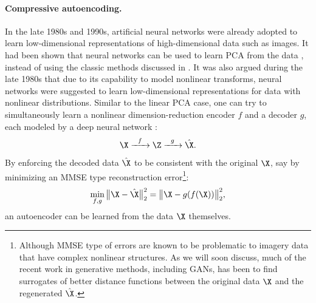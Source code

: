 \documentclass[../../book-main.tex]{subfiles}
\begin{document}
\paragraph{Compressive autoencoding.}
In the late 1980s and 1990s, artificial neural networks were already adopted to learn low-dimensional representations of high-dimensional data such as images. It had been shown that neural networks can be used to learn PCA from the data \cite{Oja1982SimplifiedNM,Baldi89}, instead of using the classic methods discussed in . It was also argued during the late 1980s that due to its capability to model nonlinear transforms, neural networks were suggested to learn low-dimensional representations for data with nonlinear distributions. Similar to the linear PCA case, one can try to simultaneously learn a nonlinear dimension-reduction encoder $f$ and a decoder $g$, each modeled by a deep neural network  \cite{Rumelhart1986,Kramer1991NonlinearPC}:
\begin{equation}
    \X   \xrightarrow{\hspace{2mm} f \hspace{2mm}} \Z  \xrightarrow{\hspace{2mm} g \hspace{2mm}} \hat \X.
       \label{eqn:auto-encoding-deep-networks}
\end{equation}
By enforcing the decoded data $\hat \X$ to be consistent with the original $\X$, say by minimizing an MMSE type reconstruction error\footnote{Although MMSE type of errors are known to be problematic to imagery data that have complex nonlinear structures. As we will soon discuss, much of the recent work in generative methods, including GANs, has been to find surrogates of better distance functions between the original data $\X$ and the regenerated $\hat \X$.}:
\begin{equation}
    \min_{f,g} \big\|\X - \hat \X\big\|_2^2 = \big\|\X - g(f( \X))\big\|_2^2,
\end{equation}
an autoencoder can be learned from the data $\X$ themselves. 
\end{document}

